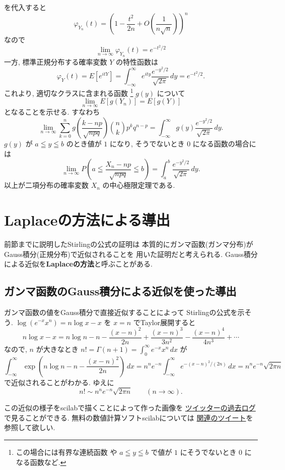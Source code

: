 \documentclass[12pt,twoside]{jarticle}
\theoremstyle{jplain}
\theoremstyle{jplain}
\theoremstyle{jplain}
\numberwithin{theorem}{section}
\numberwithin{equation}{section}
\numberwithin{figure}{section}
\numberwithin{table}{section}
\begin{document}
を代入すると
\[
\varphi_{Y_n}(t)=\left(1-\frac{t^2}{2n}+O\left(\frac{1}{n\sqrt{n}}\right)\right)^n
\]
なので
\[
\lim_{n\to\infty}\varphi_{Y_n}(t) = e^{-t^2/2}
\]
一方, 標準正規分布する確率変数 $Y$ の特性函数は
\[
\varphi_Y(t)
= E[e^{itY}]
= \int_{-\infty}^\infty e^{ity} \frac{e^{-y^2/2}}{\sqrt{2\pi}}\,dy
= e^{-t^2/2}.
\]
これより, 適切なクラスに含まれる函数%
\footnote{この場合には有界な連続函数
や $a\leqq y\leqq b$ で値が $1$ にそうでないとき $0$ になる函数など.} %
$g(y)$ について
\[
\lim_{n\to\infty} E[g(Y_n)] = E[g(Y)]
\]
となることを示せる. すなわち
\[
\lim_{n\to\infty}
\sum_{k=0}^n
g\left(\frac{k-np}{\sqrt{npq}}\right)
\binom{n}{k}p^k q^{n-p}
=
\int_{-\infty}^\infty g(y) \frac{e^{-y^2/2}}{\sqrt{2\pi}}\,dy.
\]
$g(y)$ が $a\leqq y\leqq b$ のとき値が $1$ になり, そうでないとき $0$ 
になる函数の場合には
\[
\lim_{n\to\infty}
P\left(a\leqq \frac{X_n-np}{\sqrt{npq}}\leqq b\right)
=
\int_a^b \frac{e^{-y^2/2}}{\sqrt{2\pi}}\,dy.
\]
以上が二項分布の確率変数 $X_n$ の中心極限定理である.




\section{Laplaceの方法による導出}
\label{sec:Laplace}

前節までに説明したStirlingの公式の証明は
本質的にガンマ函数(ガンマ分布)がGauss積分(正規分布)で近似されることを
用いた証明だと考えられる.
Gauss積分による近似を{\bf Laplaceの方法}と呼ぶことがある.


\subsection{ガンマ函数のGauss積分による近似を使った導出}
\label{sec:Gamma-Gauss-Stirling}

ガンマ函数の値をGauss積分で直接近似することによって
Stirlingの公式を示そう.
$\log(e^{-x}x^n)=n\log x-x$ を $x=n$ でTaylor展開すると
\[
n\log x - x
=n\log n-n
-\frac{(x-n)^2}{2n}
+\frac{(x-n)^3}{3n^2}
-\frac{(x-n)^4}{4n^3}
+\cdots
\]
なので, $n$ が大きなとき $n!=\Gamma(n+1)=\int_0^\infty e^{-x}x^n\,dx$ が
\[
\int_{-\infty}^\infty \exp\left(n\log n-n-\frac{(x-n)^2}{2n}\right)\,dx
=n^n e^{-n} \int_{-\infty}^\infty e^{-(x-n)^2/(2n)}\,dx
=n^n e^{-n} \sqrt{2\pi n}
\]
で近似されることがわかる. ゆえに
\[
n!\sim n^n e^{-n} \sqrt{2\pi n} \qquad (n\to\infty).
\]

この近似の様子をscilabで描くことによって作った画像を
\href{http://twilog.org/genkuroki/date-150709}
{ツイッターの過去ログ}で見ることができる.
無料の数値計算ソフトscilabについては
\href{http://twilog.org/genkuroki/search?word=scilab&ao=a}
{関連のツイート}を参照して欲しい.
\end{document}
